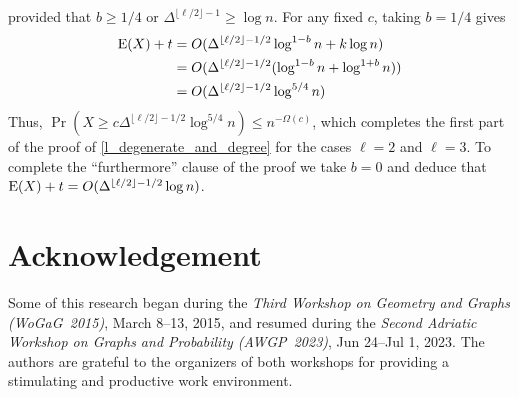 \documentclass{patmorin}
\begin{document}
provided that $b\ge 1/4$ or $\Delta^{\lfloor\ell/2\rfloor-1}\ge\log n$.
For any fixed $c$, taking $b=1/4$ gives
\begin{align*}
  \mathrm{E}(X)+t
    & = O(\Delta^{\lfloor\ell/2\rfloor-1/2}\log^{1-b} n + k\log n) \\
    & = O(\Delta^{\lfloor\ell/2\rfloor-1/2}(\log^{1-b} n + \log^{1+b} n)) \\
    & = O(\Delta^{\lfloor\ell/2\rfloor-1/2}\log^{5/4} n)
\end{align*}
Thus, $\Pr(X\ge c\Delta^{\lfloor\ell/2\rfloor-1/2}\log^{5/4} n) \le n^{-\Omega(c)}$, which completes the first part of the proof of \cref{l_degenerate_and_degree} for the cases $\ell=2$ and $\ell=3$.  To complete the ``furthermore'' clause of the proof we take $b=0$ and deduce that $\mathrm{E}(X)+t=O(\Delta^{\lfloor\ell/2\rfloor-1/2}\log n)$.


\section*{Acknowledgement}

Some of this research began during the \emph{Third Workshop on Geometry and Graphs (WoGaG~2015)}, March 8–13, 2015, and resumed during the \emph{Second Adriatic Workshop on Graphs and Probability (AWGP~2023)}, Jun 24–Jul 1, 2023. The authors are grateful to the organizers of both workshops for providing a stimulating and productive work environment.






\end{document}
